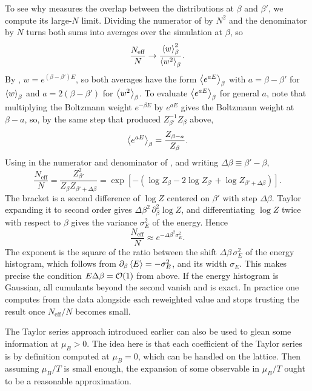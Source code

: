 To see why  measures the overlap between the distributions
at $\beta$ and $\beta'$, we compute its large-$N$ limit. Dividing the
numerator of  by $N^2$ and the denominator by $N$ turns
both sums into averages over the simulation at $\beta$, so
\begin{equation}\label{eq:Neffev}
  \frac{N_\text{eff}}{N}\to\frac{\ev{w}_\beta^2}{\ev{w^2}_\beta}.
\end{equation}
By , $w=e^{(\beta-\beta')E}$, 
so both averages have the form $\ev{e^{aE}}_\beta$ with 
$a=\beta-\beta'$ for $\ev{w}_\beta$ and $a=2(\beta-\beta')$ for $\ev{w^2}_\beta$.
To evaluate $\ev{e^{aE}}_\beta$ for general $a$, note that multiplying the
Boltzmann weight $e^{-\beta E}$ by $e^{aE}$ gives the Boltzmann weight at
$\beta-a$, so, by the same step that produced $Z_{\beta'}^{-1}Z_\beta$ above,
\begin{equation}\label{eq:RWZratio}
  \ev{e^{aE}}_\beta=\frac{Z_{\beta-a}}{Z_\beta}.
\end{equation}
Using  in the numerator and denominator of
, and writing
$\Delta\beta\equiv\beta'-\beta$,
\begin{equation}\label{eq:NeffZ}
  \frac{N_\text{eff}}{N}=\frac{Z_{\beta'}^2}{Z_\beta Z_{\beta'+\Delta\beta}}
  =\exp\left[-\left(\log Z_\beta-2\log Z_{\beta'}+\log Z_{\beta'+\Delta\beta}\right)\right].
\end{equation}
The bracket is a second difference of $\log Z$ centered on $\beta'$ with step
$\Delta\beta$. Taylor expanding it to second order gives
$\Delta\beta^2\,\partial_\beta^2\log Z$, and differentiating $\log Z$ twice
with respect to $\beta$ gives the variance $\sigma_E^2$ of the energy. Hence
\begin{equation}\label{eq:NeffGauss}
  \frac{N_\text{eff}}{N}\approx e^{-\Delta\beta^2\sigma_E^2}.
\end{equation}
The exponent is the square of the ratio between the shift
$\Delta\beta\,\sigma_E^2$ of the energy histogram, which follows from
$\partial_\beta\ev{E}=-\sigma_E^2$, and its width $\sigma_E$. This makes
precise the condition $E\Delta\beta=\order{1}$ from above. If the energy
histogram is Gaussian, all cumulants beyond the second vanish and
 is exact. In practice one computes
 from the data alongside each reweighted value and stops
trusting the result once $N_\text{eff}/N$ becomes small.


The Taylor series approach introduced earlier can also be used to
glean some information at $\mu_B>0$. The idea here is that each
coefficient of the Taylor series is by definition computed at
$\mu_B=0$, which can be handled on the lattice. Then assuming
$\mu_B/T$ is small enough, the expansion of some observable in
$\mu_B/T$ ought to be a reasonable approximation.

